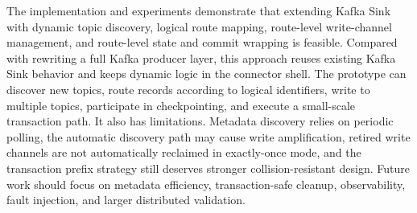 The implementation and experiments demonstrate that extending Kafka Sink with dynamic topic discovery, logical route mapping, route-level write-channel management, and route-level state and commit wrapping is feasible. Compared with rewriting a full Kafka producer layer, this approach reuses existing Kafka Sink behavior and keeps dynamic logic in the connector shell. The prototype can discover new topics, route records according to logical identifiers, write to multiple topics, participate in checkpointing, and execute a small-scale transaction path. It also has limitations. Metadata discovery relies on periodic polling, the automatic discovery path may cause write amplification, retired write channels are not automatically reclaimed in exactly-once mode, and the transaction prefix strategy still deserves stronger collision-resistant design. Future work should focus on metadata efficiency, transaction-safe cleanup, observability, fault injection, and larger distributed validation.
